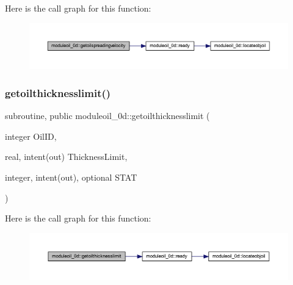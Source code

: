 Here is the call graph for this function\+:\nopagebreak
\begin{figure}[H]
\begin{center}
\leavevmode
\includegraphics[width=350pt]{namespacemoduleoil__0d_a2eecd31ffeaa8edcf98841c8c93d7fb2_cgraph}
\end{center}
\end{figure}
\mbox{\label{namespacemoduleoil__0d_addd445bd0b4ba520f5e73d1d711ce3c6}} 
\subsubsection{\texorpdfstring{getoilthicknesslimit()}{getoilthicknesslimit()}}
{\footnotesize\ttfamily subroutine, public moduleoil\+\_\+0d\+::getoilthicknesslimit (\begin{DoxyParamCaption}\item[{integer}]{Oil\+ID,  }\item[{real, intent(out)}]{Thickness\+Limit,  }\item[{integer, intent(out), optional}]{S\+T\+AT }\end{DoxyParamCaption})}

Here is the call graph for this function\+:\nopagebreak
\begin{figure}[H]
\begin{center}
\leavevmode
\includegraphics[width=350pt]{namespacemoduleoil__0d_addd445bd0b4ba520f5e73d1d711ce3c6_cgraph}
\end{center}
\end{figure}
\mbox{\label{namespacemoduleoil__0d_a6049ae3704910b8c95b19beb79419be6}} 
